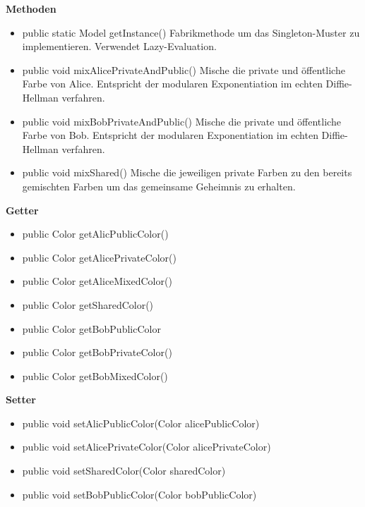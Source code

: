 \documentclass{article}
\begin{document}
      \textbf{Methoden}
      \begin{itemize}
        \item public static Model getInstance() \newline
            Fabrikmethode um das Singleton-Muster zu implementieren.
            Verwendet Lazy-Evaluation.
        \item public void mixAlicePrivateAndPublic() \newline
            Mische die private und öffentliche Farbe
            von Alice. Entspricht der modularen Exponentiation
            im echten Diffie-Hellman verfahren.
        \item public void mixBobPrivateAndPublic() \newline
            Mische die private und öffentliche Farbe
            von Bob. Entspricht der modularen Exponentiation
            im echten Diffie-Hellman verfahren.
        \item public void mixShared() \newline
            Mische die jeweiligen private Farben
            zu den bereits gemischten Farben
            um das gemeinsame Geheimnis zu erhalten.
      \end{itemize}

      \textbf{Getter}
      \begin{itemize}
        \item public Color getAlicPublicColor()
        \item public Color getAlicePrivateColor()
        \item public Color getAliceMixedColor()
        \item public Color getSharedColor()
        \item public Color getBobPublicColor
        \item public Color getBobPrivateColor()
        \item public Color getBobMixedColor()
      \end{itemize}

      \textbf{Setter}
      \begin{itemize}
        \item public void setAlicPublicColor(Color alicePublicColor)
        \item public void setAlicePrivateColor(Color alicePrivateColor)
        \item public void setSharedColor(Color sharedColor)
        \item public void setBobPublicColor(Color bobPublicColor)
      \end{itemize}
\end{document}
